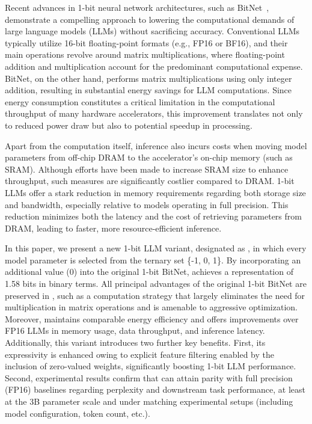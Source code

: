 Recent advances in 1-bit neural network architectures, such as BitNet~\cite{bitnet}, demonstrate a compelling approach to lowering the computational demands of large language models (LLMs) without sacrificing accuracy. Conventional LLMs typically utilize 16-bit floating-point formats (e.g., FP16 or BF16), and their main operations revolve around matrix multiplications, where floating-point addition and multiplication account for the predominant computational expense. BitNet, on the other hand, performs matrix multiplications using only integer addition, resulting in substantial energy savings for LLM computations. Since energy consumption constitutes a critical limitation in the computational throughput of many hardware accelerators, this improvement translates not only to reduced power draw but also to potential speedup in processing.

Apart from the computation itself, inference also incurs costs when moving model parameters from off-chip DRAM to the accelerator's on-chip memory (such as SRAM). Although efforts have been made to increase SRAM size to enhance throughput, such measures are significantly costlier compared to DRAM. 1-bit LLMs offer a stark reduction in memory requirements regarding both storage size and bandwidth, especially relative to models operating in full precision. This reduction minimizes both the latency and the cost of retrieving parameters from DRAM, leading to faster, more resource-efficient inference.

In this paper, we present a new 1-bit LLM variant, designated as \textbf{}, in which every model parameter is selected from the ternary set \{-1, 0, 1\}. By incorporating an additional value (0) into the original 1-bit BitNet,  achieves a representation of 1.58 bits in binary terms. All principal advantages of the original 1-bit BitNet are preserved in , such as a computation strategy that largely eliminates the need for multiplication in matrix operations and is amenable to aggressive optimization. Moreover,  maintains comparable energy efficiency and offers improvements over FP16 LLMs in memory usage, data throughput, and inference latency. Additionally, this variant introduces two further key benefits. First, its expressivity is enhanced owing to explicit feature filtering enabled by the inclusion of zero-valued weights, significantly boosting 1-bit LLM performance. Second, experimental results confirm that  can attain parity with full precision (FP16) baselines regarding perplexity and downstream task performance, at least at the 3B parameter scale and under matching experimental setups (including model configuration, token count, etc.).

